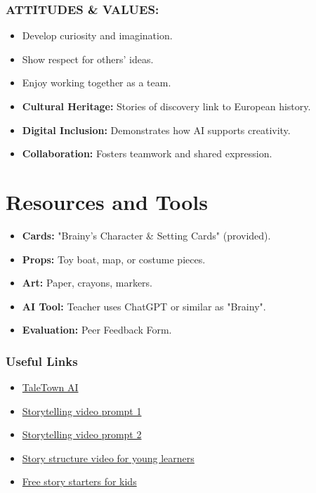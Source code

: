 \documentclass[11pt, a4paper]{article}
\begin{document}
\subsubsection*{ATTITUDES \& VALUES:}
\begin{itemize}
    \item Develop curiosity and imagination.
    \item Show respect for others' ideas.
    \item Enjoy working together as a team.
\end{itemize}

\begin{eurobox}
\begin{itemize}
    \item \textbf{Cultural Heritage:} Stories of discovery link to European history.
    \item \textbf{Digital Inclusion:} Demonstrates how AI supports creativity.
    \item \textbf{Collaboration:} Fosters teamwork and shared expression.
\end{itemize}
\end{eurobox}

\newpage
\section{Resources and Tools}
\begin{itemize}
    \item \textbf{Cards:} "Brainy's Character \& Setting Cards" (provided).
    \item \textbf{Props:} Toy boat, map, or costume pieces.
    \item \textbf{Art:} Paper, crayons, markers.
    \item \textbf{AI Tool:} Teacher uses ChatGPT or similar as "Brainy".
    \item \textbf{Evaluation:} Peer Feedback Form.
\end{itemize}

\subsubsection*{Useful Links}
\begin{itemize}
    \item \href{https://app.taletown.ai/}{TaleTown AI}
    \item \href{https://www.youtube.com/watch?v=1aHvRfK6fsQ}{Storytelling video prompt 1}
    \item \href{https://www.youtube.com/watch?v=OAx_6-wdslM}{Storytelling video prompt 2}
    \item \href{https://www.youtube.com/watch?v=1XyJPHT3TBY}{Story structure video for young learners}
    \item \href{https://www.teacherspayteachers.com/Product/Story-Seeds-for-Kids-FREEBIE-Story-Starters-3008991}{Free story starters for kids}
\end{itemize}
\end{document}
